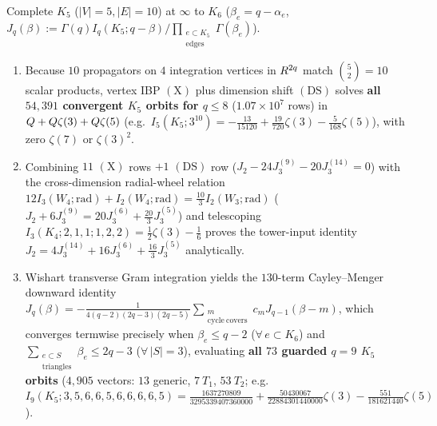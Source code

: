 \begin{theorem}[Non-planar $K_5$ closure through $q=8$, tower-input derivation, and $73$ guarded $q=9$ orbits~{\cite{CSS13,Repo9e833c8}}]
\label{thm:k5-periods}
Complete $K_5$ ($|V|=5,|E|=10$) at $\infty$ to $K_6$ ($\beta_e = q - \alpha_e$, $J_q(\beta) := \Gamma(q)I_q(K_5;q-\beta)/\prod_{\substack{e\subset K_5\\\mathrm{edges}}}\Gamma(\beta_e)$).
\begin{enumerate}[label=(\arabic*),leftmargin=*]
  \item Because $10$ propagators on $4$ integration vertices in $R^{2q}$ match $\binom{5}{2} = 10$ scalar products, vertex IBP $(\mathrm{X})$ plus dimension shift $(\mathrm{DS})$ solves \textbf{all $54{,}391$ convergent $K_5$ orbits for $q \le 8$} ($1.07\times 10^7$ rows) in $Q + Q\zeta(3) + Q\zeta(5)$ (e.g.\ $I_5(K_5;3^{10}) = -\frac{13}{15120} + \frac{19}{720}\zeta(3) - \frac{5}{168}\zeta(5)$), with zero $\zeta(7)$ or $\zeta(3)^2$.

  \item Combining $11$ $(\mathrm{X})$ rows $+ 1$ $(\mathrm{DS})$ row ($J_2 - 24J_3^{(9)} - 20J_3^{(14)} = 0$) with the cross-dimension radial-wheel relation $12I_3(W_4;\mathrm{rad}) + I_2(W_4;\mathrm{rad}) = \frac{10}{3}I_2(W_3;\mathrm{rad})$ ($J_2 + 6J_3^{(9)} = 20J_3^{(6)} + \frac{20}{3}J_3^{(5)}$) and telescoping $I_3(K_4;2,1,1;1,2,2) = \frac{1}{2}\zeta(3)-\frac{1}{6}$ proves the tower-input identity $J_2 = 4J_3^{(14)} + 16J_3^{(6)} + \frac{16}{3}J_3^{(5)}$ analytically.

  \item Wishart transverse Gram integration yields the $130$-term Cayley--Menger downward identity $J_q(\beta) = -\frac{1}{4(q-2)(2q-3)(2q-5)}\sum_{\substack{m\\\mathrm{cycle\ covers}}}c_m J_{q-1}(\beta-m)$, which converges termwise precisely when $\beta_e \le q-2$ ($\forall\,e\subset K_6$) and $\sum_{\substack{e\subset S\\\mathrm{triangles}}}\beta_e \le 2q-3$ ($\forall\,|S|=3$), evaluating \textbf{all $73$ guarded $q=9$ $K_5$ orbits} ($4{,}905$ vectors: $13$ generic, $7\ T_1$, $53\ T_2$; e.g.\ $I_9(K_5;3,5,6,6,5,6,6,6,6,5) = \frac{1637270809}{3295339407360000} + \frac{50430067}{22884301440000}\zeta(3) - \frac{551}{181621440}\zeta(5)$).
\end{enumerate}
\end{theorem}

